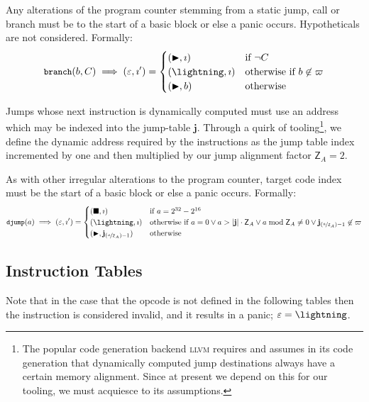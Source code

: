 Any alterations of the program counter stemming from a static jump, call or branch must be to the start of a basic block or else a panic occurs. Hypotheticals are not considered. Formally:
\begin{equation}
  \token{branch}(b, C) \implies (\varepsilon, \imath') = \begin{cases}
    (\continue, \imath) &\when \lnot C \\
    (\panic, \imath) &\otherwhen b \not\in \basicblocks \\
    (\continue, b) &\otherwise
  \end{cases}
\end{equation}

Jumps whose next instruction is dynamically computed must use an address which may be indexed into the jump-table $\mathbf{j}$. Through a quirk of tooling\footnote{The popular code generation backend \textsc{llvm} requires and assumes in its code generation that dynamically computed jump destinations always have a certain memory alignment. Since at present we depend on this for our tooling, we must acquiesce to its assumptions.}, we define the dynamic address required by the instructions as the jump table index incremented by one and then multiplied by our jump alignment factor $\mathsf{Z}_A = 2$.

As with other irregular alterations to the program counter, target code index must be the start of a basic block or else a panic occurs. Formally:
\begin{equation}\label{eq:jumptablealignment}
  \token{djump}(a) \implies (\varepsilon, \imath') = \begin{cases}
    (\halt, \imath) &\when a = 2^{32} - 2^{16}\\
    (\panic, \imath) &\otherwhen a = 0 \vee a > |\mathbf{j}|\cdot\mathsf{Z}_A \vee a \bmod \mathsf{Z}_A \ne 0 \vee \mathbf{j}_{(\nicefrac{a}{\mathsf{Z}_A}) - 1} \not\in \basicblocks \\
    (\continue, \mathbf{j}_{(\nicefrac{a}{\mathsf{Z}_A}) - 1}) &\otherwise
  \end{cases}
\end{equation}

\subsection{Instruction Tables}\label{sec:instructiontables}

Note that in the case that the opcode is not defined in the following tables then the instruction is considered invalid, and it results in a panic; $\varepsilon=\panic$.

